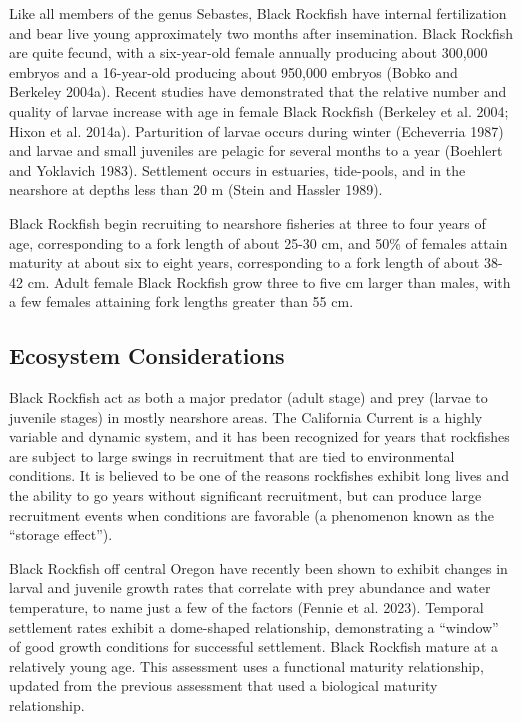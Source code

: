 \documentclass[11pt,
  english,
  letterpaper,
]{article}
\begin{document}
Like all members of the genus Sebastes, Black Rockfish have internal fertilization and bear live young approximately two months after insemination. Black Rockfish are quite fecund, with a six-year-old female annually producing about 300,000 embryos and a 16-year-old producing about 950,000 embryos (Bobko and Berkeley 2004a). Recent studies have demonstrated that the relative number and quality of larvae increase with age in female Black Rockfish (Berkeley et al. 2004; Hixon et al. 2014a). Parturition of larvae occurs during winter (Echeverria 1987) and larvae and small juveniles are pelagic for several months to a year (Boehlert and Yoklavich 1983). Settlement occurs in estuaries, tide-pools, and in the nearshore at depths less than 20 m (Stein and Hassler 1989).

Black Rockfish begin recruiting to nearshore fisheries at three to four years of age, corresponding to a fork length of about 25-30 cm, and 50\% of females attain maturity at about six to eight years, corresponding to a fork length of about 38-42 cm. Adult female Black Rockfish grow three to five cm larger than males, with a few females attaining fork lengths greater than 55 cm.

\hypertarget{ecosystem-considerations-1}{%
\subsection{Ecosystem Considerations}\label{ecosystem-considerations-1}}

Black Rockfish act as both a major predator (adult stage) and prey (larvae to juvenile stages) in mostly nearshore areas. The California Current is a highly variable and dynamic system, and it has been recognized for years that rockfishes are subject to large swings in recruitment that are tied to environmental conditions. It is believed to be one of the reasons rockfishes exhibit long lives and the ability to go years without significant recruitment, but can produce large recruitment events when conditions are favorable (a phenomenon known as the ``storage effect'').

Black Rockfish off central Oregon have recently been shown to exhibit changes in larval and juvenile growth rates that correlate with prey abundance and water temperature, to name just a few of the factors (Fennie et al. 2023). Temporal settlement rates exhibit a dome-shaped relationship, demonstrating a ``window'' of good growth conditions for successful settlement. Black Rockfish mature at a relatively young age. This assessment uses a functional maturity relationship, updated from the previous assessment that used a biological maturity relationship.
\end{document}
